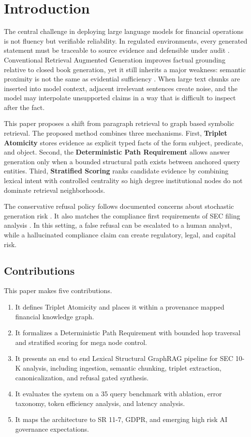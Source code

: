 \documentclass[conference]{IEEEtran}
\begin{document}
\section{Introduction}
The central challenge in deploying large language models for financial operations is not fluency but verifiable reliability. In regulated environments, every generated statement must be traceable to source evidence and defensible under audit \cite{basel,gdpr,sr117,bcbs239,iso27001,pci40}. Conventional Retrieval Augmented Generation improves factual grounding relative to closed book generation, yet it still inherits a major weakness: semantic proximity is not the same as evidential sufficiency \cite{lewis2020rag,karpukhin2020dpr,colbert2020,splade2021,atlas2022}. When large text chunks are inserted into model context, adjacent irrelevant sentences create noise, and the model may interpolate unsupported claims in a way that is difficult to inspect after the fact.

This paper proposes a shift from paragraph retrieval to graph based symbolic retrieval. The proposed method combines three mechanisms. First, \textbf{Triplet Atomicity} stores evidence as explicit typed facts of the form subject, predicate, and object. Second, the \textbf{Deterministic Path Requirement} allows answer generation only when a bounded structural path exists between anchored query entities. Third, \textbf{Stratified Scoring} ranks candidate evidence by combining lexical intent with controlled centrality so high degree institutional nodes do not dominate retrieval neighborhoods.

The conservative refusal policy follows documented concerns about stochastic generation risk \cite{bender2021stochastic}. It also matches the compliance first requirements of SEC filing analysis \cite{sec10k,projectnotes}. In this setting, a false refusal can be escalated to a human analyst, while a hallucinated compliance claim can create regulatory, legal, and capital risk.

\subsection*{Contributions}
This paper makes five contributions.
\begin{enumerate}
  \item It defines Triplet Atomicity and places it within a provenance mapped financial knowledge graph.
  \item It formalizes a Deterministic Path Requirement with bounded hop traversal and stratified scoring for mega node control.
  \item It presents an end to end Lexical Structural GraphRAG pipeline for SEC 10-K analysis, including ingestion, semantic chunking, triplet extraction, canonicalization, and refusal gated synthesis.
  \item It evaluates the system on a 35 query benchmark with ablation, error taxonomy, token efficiency analysis, and latency analysis.
  \item It maps the architecture to SR 11-7, GDPR, and emerging high risk AI governance expectations.
\end{enumerate}
\end{document}
